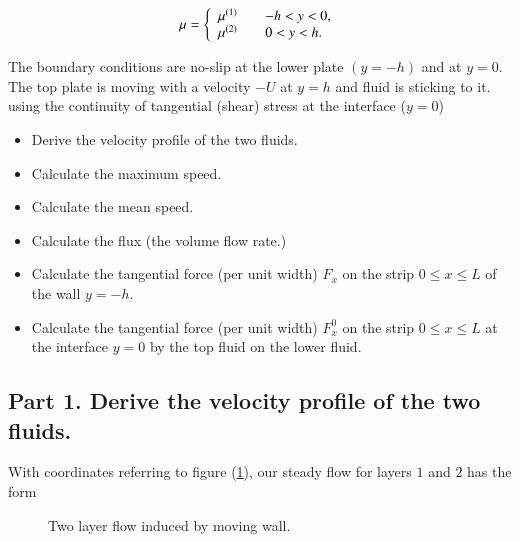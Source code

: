 \begin{equation}\label{eqn:continuumProblemSet2:120}
\mu =
\left\{
\begin{array}{l l}
\mu^{(1)} & \quad \mbox{$-h < y < 0,$} \\
\mu^{(2)} & \quad \mbox{$0 < y < h.$}
\end{array}
\right.
\end{equation}

The boundary conditions are no-slip at the lower plate $(y = -h)$ and at $y = 0$.  The top plate is moving with a velocity $-U$ at $y = h$ and fluid is sticking to it.  using the continuity of tangential (shear) stress at the interface ($y = 0$)

\begin{itemize}
\item Derive the velocity profile of the two fluids.
\item Calculate the maximum speed.
\item Calculate the mean speed.
\item Calculate the flux (the volume flow rate.)
\item Calculate the tangential force (per unit width) $F_x$ on the strip $0 \le x \le L$ of the wall $y = -h$.
\item Calculate the tangential force (per unit width) $F_x^0$ on the strip $0 \le x \le L$ at the interface $y = 0$ by the top fluid on the lower fluid.
\end{itemize}

\subsection{Part 1.  Derive the velocity profile of the two fluids.}

With coordinates referring to figure (\ref{fig:continuumProblemSet2:continuumProblemSet2Fig2}), our steady flow for layers $1$ and $2$ has the form

\begin{figure}[htp]
   \centering
   \def\svgwidth{0.4\columnwidth}
   
   \caption{Two layer flow induced by moving wall.}\label{fig:continuumProblemSet2:continuumProblemSet2Fig2}
\end{figure}

